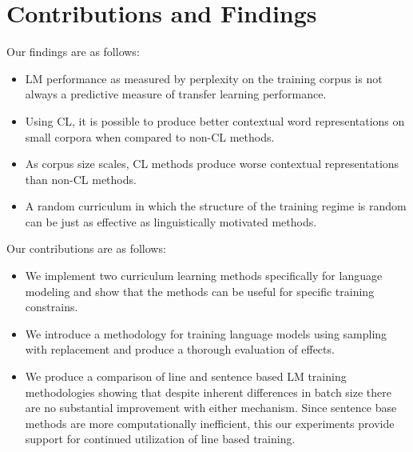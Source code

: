 \section{Contributions and Findings}
\label{chap:intro:sec:contributions}
Our findings are as follows:
\begin{itemize}
  \item LM performance as measured by perplexity on the training corpus is not always a predictive measure of transfer learning performance.
  \item Using CL, it is possible to produce better contextual word representations on small corpora when compared to non-CL methods. 
  \item As corpus size scales, CL methods produce worse contextual representations than non-CL methods.
  \item A random curriculum in which the structure of the training regime is random can be just as effective as linguistically motivated methods.
\end{itemize}
Our contributions are as follows:
\begin{itemize}
    \item We implement two curriculum learning methods specifically for language modeling and show that the methods can be useful for specific training constrains.
    \item We introduce a methodology for training language models using sampling with replacement and produce a thorough evaluation of effects.
    \item We produce a comparison of line and sentence based LM training methodologies showing that despite inherent differences in batch size there are no substantial improvement with either mechanism. Since sentence base methods are more computationally inefficient, this our experiments provide support for continued utilization of line based training.
\end{itemize}
